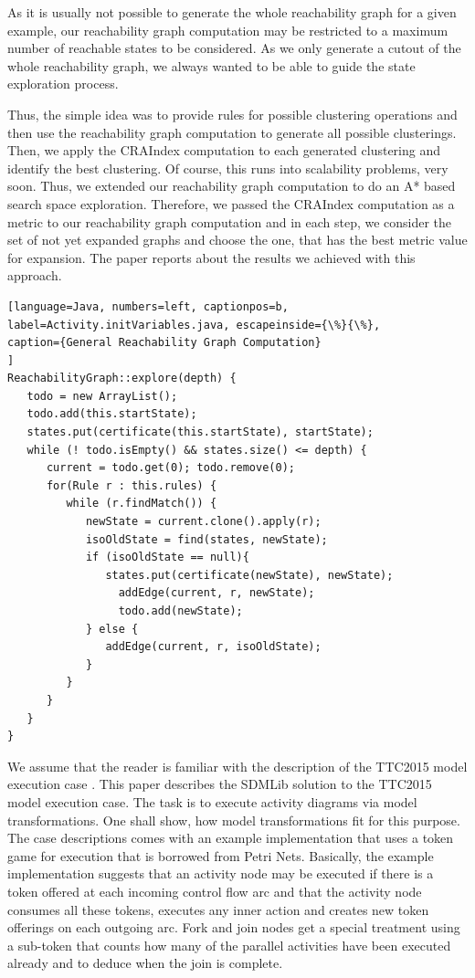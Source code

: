 \documentclass[submission,copyright,creativecommons]{eptcs}
\begin{document}
As it is usually not possible to generate the whole reachability graph for a given example, 
our reachability graph computation may be restricted to a maximum number of reachable 
states to be considered. As we only generate a cutout of the whole reachability graph, we 
always wanted to be able to guide the state exploration process.  
 


Thus, 
the simple idea was to provide rules for possible clustering operations and then use the
reachability graph computation to generate all possible clusterings. Then, we apply the
CRAIndex computation to each generated clustering and identify the best clustering. Of course,
this runs into scalability problems, very soon. Thus, we extended our reachability graph 
computation to do an A* based search space exploration. Therefore, we passed the CRAIndex 
computation as a metric to our reachability graph computation and in each step, we consider 
the set of not yet expanded graphs and choose the one, that has the best metric value for 
expansion. The paper reports about the results we achieved with this approach.  


\begin{lstlisting}[language=Java, numbers=left, captionpos=b, 
label=Activity.initVariables.java, escapeinside={\%}{\%},
caption={General Reachability Graph Computation}
]
ReachabilityGraph::explore(depth) {
   todo = new ArrayList();
   todo.add(this.startState);
   states.put(certificate(this.startState), startState);
   while (! todo.isEmpty() && states.size() <= depth) {
      current = todo.get(0); todo.remove(0);
      for(Rule r : this.rules) {
         while (r.findMatch()) {
            newState = current.clone().apply(r);
            isoOldState = find(states, newState);
            if (isoOldState == null){
               states.put(certificate(newState), newState);
            	 addEdge(current, r, newState);
             	 todo.add(newState);
            } else {
               addEdge(current, r, isoOldState);
            }
         }
      }
   }
}

\end{lstlisting}



We assume that the reader is familiar with the description of the TTC2015 model execution 
case \cite{ttc2015-model_execution}. This paper describes the SDMLib \cite{sdmlib} solution to the TTC2015 model 
execution case. The task is 
to execute activity diagrams via model transformations. One shall show, how model 
transformations fit for this purpose. The case descriptions comes with an example 
implementation that uses a token game for execution that is borrowed from Petri Nets. 
Basically, the example implementation suggests that an activity node may be executed if 
there is a token offered at each incoming control flow arc and that the activity node consumes 
all these tokens, executes any inner action and creates new token offerings on each outgoing arc. Fork and join nodes get a special treatment using a sub-token that counts how many of the 
parallel activities have been executed already and to deduce when the join is complete.  
\end{document}
